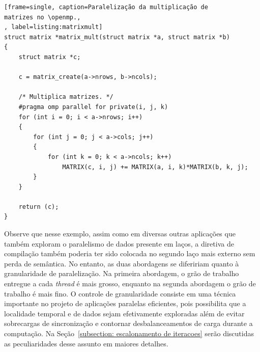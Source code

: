\documentclass{SBCbookchapter}
\begin{document}
\begin{lstlisting}[frame=single, caption=Paralelização da multiplicação de
matrizes no \openmp.,
, label=listing:matrixmult]
struct matrix *matrix_mult(struct matrix *a, struct matrix *b)
{
	struct matrix *c;

	c = matrix_create(a->nrows, b->ncols);

	/* Multiplica matrizes. */
	#pragma omp parallel for private(i, j, k)
	for (int i = 0; i < a->nrows; i++)
	{
		for (int j = 0; j < a->cols; j++)
		{
			for (int k = 0; k < a->ncols; k++)
				MATRIX(c, i, j) += MATRIX(a, i, k)*MATRIX(b, k, j);
		}
	}

	return (c);
}
\end{lstlisting}

		Observe que nesse exemplo, assim como em diversas outras aplicações que
		também exploram o paralelismo de dados presente em laços, a diretiva de
		compilação também poderia ter sido colocada no segundo laço mais externo
		sem perda de semântica. No entanto, as duas abordagens se difeririam
		quanto à granularidade de paralelização. Na primeira abordagem, o grão
		de trabalho entregue a cada \textit{thread} é mais grosso, enquanto na segunda
		abordagem o grão de trabalho é mais fino. O controle de granularidade
		consiste em uma técnica importante no projeto de aplicações paralelas
		eficientes, pois possibilita que a localidade temporal e de dados sejam efetivamente
		exploradas além de evitar sobrecargas de sincronização e contornar desbalanceamentos
		de carga durante a computação. Na Seção~\ref{subsection: escalonamento de iteracoes}
		serão discutidas as peculiaridades desse assunto em maiores detalhes.
\end{document}
